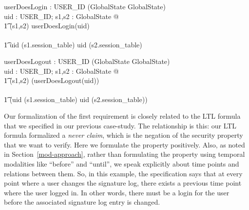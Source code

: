 \documentclass[a4paper,pdftex]{article}
\begin{document}
\begin{axdef}
userDoesLogin : USER\_ID \fun (GlobalState \rel GlobalState) \\
\where
\forall uid : USER\_ID; s1,s2 : GlobalState @ \\
\t1 (s1,s2) \in userDoesLogin(uid)            \\
 \iff                                         \\
\t1    uid \notin \dom(s1.session\_table) \land  uid \in \dom(s2.session\_table) 
\end{axdef} 

\begin{axdef}
userDoesLogout : USER\_ID \fun (GlobalState \rel GlobalState) \\
\where
\forall uid : USER\_ID; s1,s2 : GlobalState @ \\
\t1 (s1,s2) \in (userDoesLogout(uid))         \\
\iff                                          \\
\t1      (uid \in \dom(s1.session\_table) \land  uid \notin \dom(s2.session\_table)) 
\end{axdef} 

Our formalization of the first requirement is closely related to the LTL
formula that we specified in our previous case-study.  The relationship
is this: our LTL formula formalized a \emph{never claim}, which is the
negation of the security property that we want to verify.  Here we
formulate the property positively.  Also, as noted in
Section~\ref{mod-approach}, rather than formulating the property using
temporal modalities like ``before'' and ``until'', we speak explicitly
about time points and relations between them.  So, in this example, the
specification says that at every point where a user changes the
signature log, there exists a previous time point where the user logged
in.  In other words, there must be a login for the user before the
associated signature log entry is changed.
\end{document}
